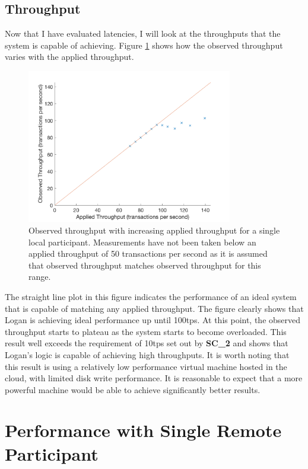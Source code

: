 \documentclass[12pt,a4paper,twoside,openright]{report}
\begin{document}
	\subsection{Throughput}
	Now that I have evaluated latencies, I will look at the throughputs that the system is capable of achieving.
	Figure \ref{fig:singlocal} shows how the observed throughput varies with the applied throughput.  
	\begin{figure}
		\centering
		\includegraphics[width=0.8\textwidth]{figs/appliedvsobservedlocal.png} 
		\caption{Observed throughput with increasing applied throughput for a single local participant. Measurements have not been taken below an applied throughput of 50 transactions per second as it is assumed that observed throughput matches observed throughput for this range.}
		\label{fig:singlocal}
	\end{figure}
	The straight line plot in this figure indicates the performance of an ideal system that is capable of matching any applied throughput.
	The figure clearly shows that Logan is achieving ideal performance up until 100tps.
	At this point, the observed throughput starts to plateau as the system starts to become overloaded. 
	This result well exceeds the requirement of 10tps set out by \textbf{SC\_2} and shows that Logan's logic is capable of achieving high throughputs.
	It is worth noting that this result is using a relatively low performance virtual machine hosted in the cloud, with limited disk write performance. 
	It is reasonable to expect that a more powerful machine would be able to achieve significantly better results.\\

	\section{Performance with Single Remote Participant}
\end{document}
